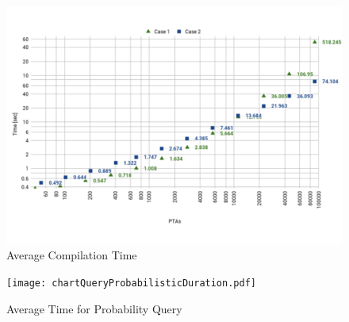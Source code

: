 \documentclass[letterpaper]{article}
\begin{document}
\begin{figure}[h]
\centering
 \includegraphics[width=.63\linewidth]{chartCompilationDuration.pdf}  
 \vspace{-0.35in}
\caption{Average Compilation Time}
\label{fig:compilation-time}
\end{figure}

\begin{figure}[htb!]
  \centering
  \texttt{[image: chartQueryProbabilisticDuration.pdf]}  
  \vspace{-0.17in}
  \caption{Average Time for Probability Query}
  \label{fig:time-prob-query}
\end{figure}

\end{document}
